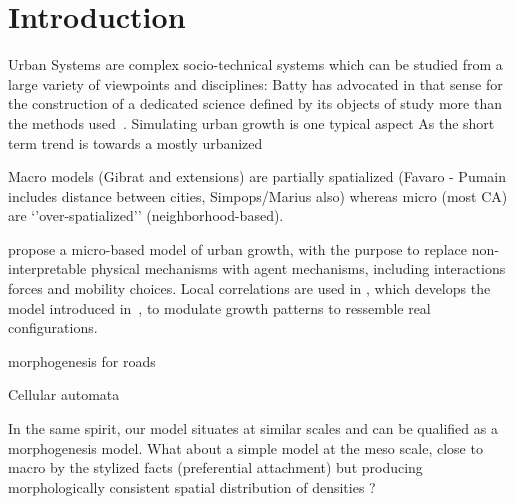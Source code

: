 \documentclass[10pt,letterpaper,draft]{article}
\begin{document}
\linenumbers

\justify


\section*{Introduction}


Urban Systems are complex socio-technical systems which can be studied from a large variety of viewpoints and disciplines: Batty has advocated in that sense for the construction of a dedicated science defined by its objects of study more than the methods used~\cite{batty2013new}. Simulating urban growth is one typical aspect 
As the short term trend is towards a mostly urbanized 




\cite{rozenfeld2008laws}

Macro models (Gibrat and extensions) are partially spatialized (Favaro - Pumain includes distance between cities, Simpops/Marius also) whereas micro (most CA) are ‘’over-spatialized’’ (neighborhood-based).  
\cite{bretagnolle2000long} \cite{favaro2011gibrat}

\cite{gabaix1999zipf}



\cite{andersson2002urban} propose a micro-based model of urban growth, with the purpose to replace non-interpretable physical mechanisms with agent mechanisms, including interactions forces and mobility choices. Local correlations are used in \cite{makse1998modeling}, which develops the model introduced in~\cite{makse1995modelling},  to modulate growth patterns to ressemble real configurations. 

\cite{courtat2011mathematics} morphogenesis for roads

Cellular automata \cite{ward2000stochastically} \cite{GEAN:GEAN940}


\cite{clarke1998loose}

\cite{clarke2007decade}

\cite{frankhauser1998fractal}

\cite{raimbault2014hybrid}



In the same spirit, our model situates at similar scales and can be qualified as a morphogenesis model.  What about a simple model at the meso scale, close to macro by the stylized facts (preferential attachment) but producing morphologically consistent spatial distribution of densities ?
\end{document}
